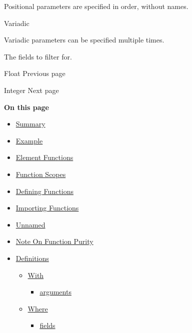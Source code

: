 \label{definitions-where-fields-positional-tooltip}
Positional parameters are specified in order, without names.

{{ Variadic }}

\label{definitions-where-fields-variadic-tooltip}
Variadic parameters can be specified multiple times.

The fields to filter for.

\href{/docs/reference/foundations/float/}{\pandocbounded{}}

{ Float } { Previous page }

\href{/docs/reference/foundations/int/}{\pandocbounded{}}

{ Integer } { Next page }

\textbf{On this page}

\begin{itemize}
\tightlist
\item
  \hyperref[summary]{Summary}
\item
  \hyperref[example]{Example}
\item
  \hyperref[element-functions]{Element Functions}
\item
  \hyperref[function-scopes]{Function Scopes}
\item
  \hyperref[defining-functions]{Defining Functions}
\item
  \hyperref[importing-functions]{Importing Functions}
\item
  \hyperref[unnamed]{Unnamed}
\item
  \hyperref[note-on-function-purity]{Note On Function Purity}
\item
  \hyperref[definitions]{Definitions}

  \begin{itemize}
  \tightlist
  \item
    \hyperref[definitions-with]{With}

    \begin{itemize}
    \tightlist
    \item
      \hyperref[definitions-with-arguments]{arguments}
    \end{itemize}
  \item
    \hyperref[definitions-where]{Where}

    \begin{itemize}
    \tightlist
    \item
      \hyperref[definitions-where-fields]{fields}
    \end{itemize}
  \end{itemize}
\end{itemize}

